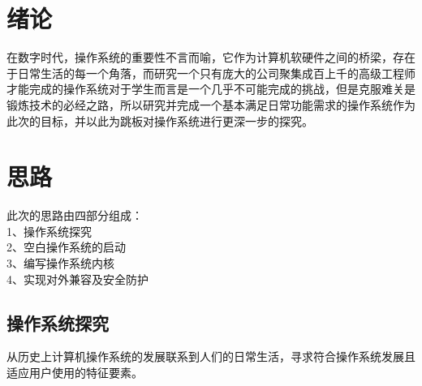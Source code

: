 \documentclass{swfcthesis}
\begin{document}

\makepreliminarypages%
\frontmatter          
\tableofcontents     %
\listoffigures       %
\listoftables        %
\mainmatter

\chapter{绪论}
在数字时代，操作系统的重要性不言而喻，它作为计算机软硬件之间的桥梁，存在于日常生活的每一个角落，而研究一个只有庞大的公司聚集成百上千的高级工程师才能完成的操作系统对于学生而言是一个几乎不可能完成的挑战，但是克服难关是锻炼技术的必经之路\cite{30_os}，所以研究并完成一个基本满足日常功能需求的操作系统作为此次的目标，并以此为跳板对操作系统进行更深一步的探究。

\chapter{思路}

	此次的思路由四部分组成：\\
	\hspace*{1.5cm}1、操作系统探究 \\
	\hspace*{1.5cm}2、空白操作系统的启动 \\
	\hspace*{1.5cm}3、编写操作系统内核 \\
	\hspace*{1.5cm}4、实现对外兼容及安全防护
	
	\section{操作系统探究}
	从历史上计算机操作系统的发展联系到人们的日常生活，寻求符合操作系统发展且适应用户使用的特征要素。
	
\end{document}
